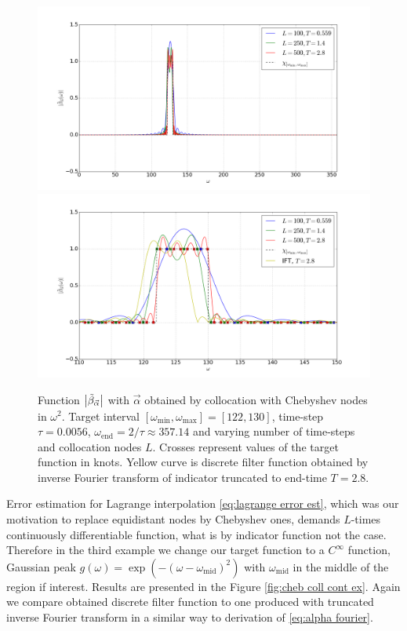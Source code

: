 \documentclass[a4paper,11pt,bibliography=totoc,listof=totoc,headinclude=true,cleardoublepage=empty,oneside]{scrbook}
\newcommand{\dffv}{\Tilde{\beta}_{\Vec{\alpha}}}
\newcommand{\e}{\mathrm{end}}
\begin{document}
\begin{figure}
    \centering
    \includegraphics[width=1\linewidth]{latex//images//cheb_coll/Figure_3.png}
    \includegraphics[width=1\linewidth]{latex//images//cheb_coll/Figure_4.png}
    \caption{Function $\left|\dffv\right|$ with $\Vec{\alpha}$ obtained by collocation with Chebyshev nodes in $\omega^2$. Target interval $\left[\omega_{\min}, \omega_{\max} \right] = [122, 130]$, time-step $\tau = 0.0056$, $\omega_\e = 2/\tau \approx 357.14$ and varying number of time-steps and collocation nodes $L$. Crosses represent values of the target function in knots. Yellow curve is discrete filter function obtained by inverse Fourier transform of indicator truncated to end-time $T=2.8$.}
    \label{fig:cheb coll 2}
\end{figure}

Error estimation for Lagrange interpolation \eqref{eq:lagrange error est}, which was our motivation to replace equidistant nodes by Chebyshev ones, demands $L$-times continuously differentiable function, what is by indicator function not the case. Therefore in the third example we change our target function to a $C^\infty$ function, Gaussian peak $g(\omega) = \exp\left(-(\omega-\omega_{\mathrm{mid}})^2\right)$ with $\omega_{\mathrm{mid}}$ in the middle of the region if interest. Results are presented in the Figure \ref{fig:cheb coll cont ex}. Again we compare obtained discrete filter function to one produced with truncated inverse Fourier transform in a similar way to derivation of \eqref{eq:alpha fourier}. 
\end{document}
